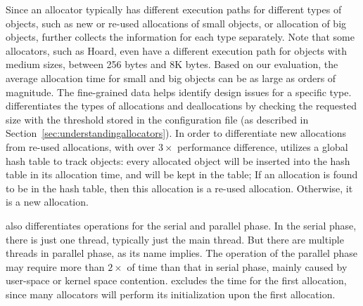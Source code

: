 Since an allocator typically has different execution paths for different types of objects, such as new or re-used allocations of small objects, or allocation of big objects, \MP{} further collects the information for each type separately. Note that some allocators, such as Hoard, even have a different execution path for objects with medium sizes, between 256 bytes and 8K bytes. Based on our evaluation, the average allocation time for small and big objects can be as large as orders of magnitude. The fine-grained data helps identify design issues for a specific type. \MP{} differentiates the types of allocations and deallocations by checking the requested size with the threshold stored in the configuration file (as described in Section~\ref{sec:understandingallocators}). In order to differentiate new allocations from re-used allocations, with over $3\times$ performance difference, \MP{} utilizes a global hash table to track objects: every allocated object will be inserted into the hash table in its allocation time, and will be kept in the table; If an allocation is found to be in the hash table, then this allocation is a re-used allocation. Otherwise, it is a new allocation. 

\MP{} also differentiates operations for the serial and parallel phase. In the serial phase, there is just one thread, typically just the main thread. But there are multiple threads in parallel phase, as its name implies. The operation of the parallel phase may require more than $2\times$ of time than that in serial phase, mainly caused by user-space or kernel space contention. \MP{} excludes the time for the first allocation, since many allocators will perform its initialization upon the first allocation.  

